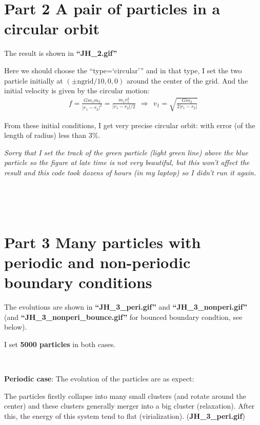 \documentclass[showpacs, oneside, onecolumn, prl, amsmath, amssymb, nofootinbib, superscriptaddress, notitlepage]{revtex4-1}
\newcommand\bas{\begin{align*}}
\begin{document}
\section{Part 2 A pair of particles in a circular orbit}

The result is shown in \textbf{``JH\_2.gif''}

Here we should choose the ``type=`circular''' and in that type, I set the two particle initially at $(\pm \text{ngrid}/10,0,0)$ around the center of the grid. And the initial velocity is given by the circular motion:
\bas
f=\frac{Gm_1m_2}{|r_1-r_2|^2}=\frac{m_1v_1^2}{|r_1-r_2|/2}\ \ \Rightarrow\ \ v_1=\sqrt{\frac{Gm_2}{2|r_1-r_2|}}
\end{align*}

From these initial conditions, I get very precise circular orbit: with error (of the length of radius) less than $3\%$.

\textit{Sorry that I set the track of the green particle (light green line) above the blue particle so the figure at late time is not very beautiful, but this won't affect the result and this code took dozens of hours (in my laptop) so I didn't run it again.}

~~~~

~~~~

\section{Part 3 Many particles with periodic and non-periodic boundary conditions}

The evolutions are shown in \textbf{``JH\_3\_peri.gif''} and \textbf{``JH\_3\_nonperi.gif''} (and \textbf{``JH\_3\_nonperi\_bounce.gif''} for bounced boundary condtion, see below).

I set \textbf{5000 particles} in both cases.

~~~~

\textbf{Periodic case}: The evolution of the particles are as expect:

The particles firstly collapse into many small clusters (and rotate around the center) and these clusters generally merger into a big cluster (relaxation). After this, the energy of this system tend to flat (virialization).
\newline(\textbf{JH\_3\_peri.gif})
\end{document}
